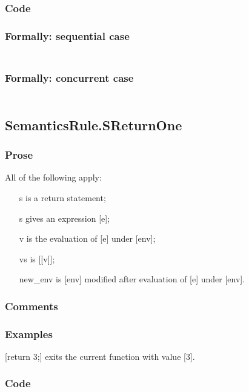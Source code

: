 \documentclass{book}
\begin{document}
  \subsubsection{Code}

  \subsubsection{Formally: sequential case}
  \begin{align}
  \end{align} 

  \subsubsection{Formally: concurrent case}
  \begin{align}
  \end{align} 

\subsection{SemanticsRule.SReturnOne \label{sec:SemanticsRule.SReturnOne}}

    \subsubsection{Prose}
    All of the following apply:
    \begin{itemize}
    \item [s] is a return statement;
    \item [s] gives an expression [e];
    \item [v] is the evaluation of [e] under [env];
    \item [vs] is [[v]];
    \item [new\_env] is [env] modified after evaluation of [e] under [env].
    \end{itemize}

    \subsubsection{Comments}

    \subsubsection{Examples}
    [return 3;] exits the current function with value [3].

  \subsubsection{Code}
\end{document}
